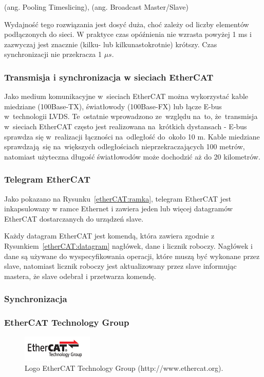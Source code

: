 (ang. Pooling Timeslicing), (ang. Broadcast Master/Slave)

Wydajność tego rozwiązania jest dosyć duża, choć zależy od liczby elementów podłączonych do sieci. W praktyce czas opóźnienia nie wzrasta powyżej 1 ms i zazwyczaj jest znacznie (kilku- lub kilkunastokrotnie) krótszy. Czas synchronizacji nie przekracza 1 $\mu s$.

\subsubsection{Transmisja i synchronizacja w sieciach EtherCAT}

Jako medium komunikacyjne w~sieciach EtherCAT można wykorzystać kable miedziane (100Base-TX), światłowody (100Base-FX) lub łącze E-bus w~technologii LVDS. Te~ostatnie wprowadzono ze~względu na~to, że~transmisja w~sieciach EtherCAT często jest realizowana na~krótkich dystansach - E-bus sprawdza się w~realizacji łączności na~odległość do~około 10 m. Kable miedziane sprawdzają~się na~większych odległościach nieprzekraczających 100 metrów, natomiast użyteczna długość światłowodów może dochodzić aż do 20 kilometrów.

\subsubsection{Telegram EtherCAT}
Jako pokazano na Rysunku~\ref{etherCAT:ramka}, telegram EtherCAT jest inkapsulowany w  ramce Ethernet i  zawiera jeden lub więcej datagramów EtherCAT dostarczanych do urządzeń slave. 

Każdy datagram EtherCAT jest komendą, która zawiera zgodnie z Rysunkiem~\ref{etherCAT:datagram} nagłówek, dane i licznik roboczy. Nagłówek i dane są używane do wyspecyfikowania operacji, które muszą być wykonane przez slave, natomiast licznik roboczy jest aktualizowany przez slave informując mastera, że slave odebrał i przetwarza komendę.

\subsubsection{Synchronizacja}


\subsubsection{EtherCAT Technology Group}
\begin{figure}[!htb] 	\centering 	\includegraphics[width=0.3\textwidth]{images/logoETG} \caption{Logo EtherCAT Technology Group (http://www.ethercat.org).} \label{logoETG} \end{figure}

